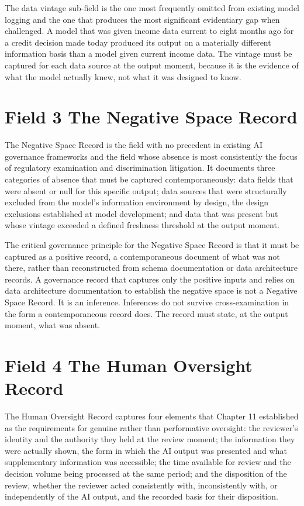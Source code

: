 The data vintage sub-field is the one most frequently omitted from existing model logging and the one that produces the most significant evidentiary gap when challenged. A model that was given income data current to eight months ago for a credit decision made today produced its output on a materially different information basis than a model given current income data. The vintage must be captured for each data source at the output moment, because it is the evidence of what the model actually knew, not what it was designed to know.

\section{Field 3 The Negative Space Record}

The Negative Space Record is the field with no precedent in existing AI governance frameworks and the field whose absence is most consistently the focus of regulatory examination and discrimination litigation. It documents three categories of absence that must be captured contemporaneously: data fields that were absent or null for this specific output; data sources that were structurally excluded from the model's information environment by design, the design exclusions established at model development; and data that was present but whose vintage exceeded a defined freshness threshold at the output moment.

The critical governance principle for the Negative Space Record is that it must be captured as a positive record, a contemporaneous document of what was not there, rather than reconstructed from schema documentation or data architecture records. A governance record that captures only the positive inputs and relies on data architecture documentation to establish the negative space is not a Negative Space Record. It is an inference. Inferences do not survive cross-examination in the form a contemporaneous record does. The record must state, at the output moment, what was absent.

\section{Field 4 The Human Oversight Record}

The Human Oversight Record captures four elements that Chapter 11 established as the requirements for genuine rather than performative oversight: the reviewer's identity and the authority they held at the review moment; the information they were actually shown, the form in which the AI output was presented and what supplementary information was accessible; the time available for review and the decision volume being processed at the same period; and the disposition of the review, whether the reviewer acted consistently with, inconsistently with, or independently of the AI output, and the recorded basis for their disposition.

